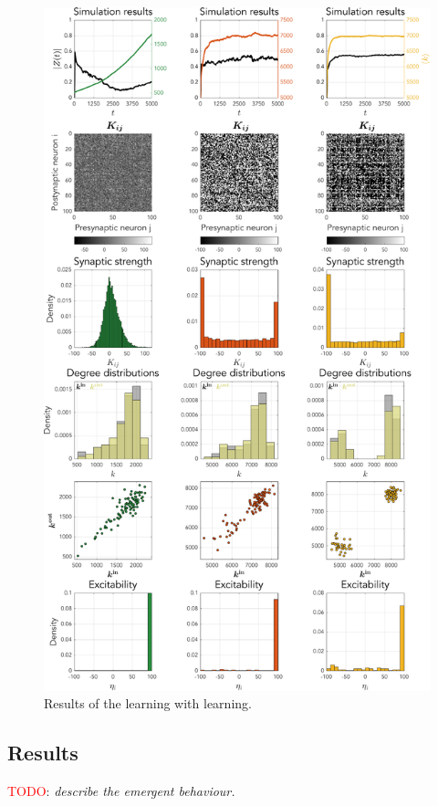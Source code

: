 \begin{figure}[H]
\centering
\includegraphics[height = \textheight]{../Figures/Learning/STDPandIP.pdf}
\caption{Results of the \STDP learning with \IP learning.}
\label{fig:STDPandIP}
\end{figure}

\subsection{Results}
\textcolor{red}{TODO}: \textsl{describe the emergent behaviour.}

